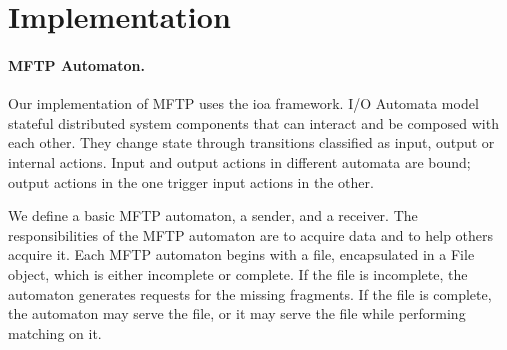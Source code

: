 \documentclass[letterpaper]{article}
\begin{document}




\section{Implementation}



\paragraph{MFTP Automaton.}
Our implementation of MFTP uses the ioa framework.
I/O Automata model stateful distributed system components that can interact and be composed with each other.
They change state through transitions classified as input, output or internal actions.
Input and output actions in different automata are bound; output actions in the one trigger input actions in the other.

We define a basic MFTP automaton, a sender, and a receiver.
The responsibilities of the MFTP automaton are to acquire data and to help others acquire it.
Each MFTP automaton begins with a file, encapsulated in a File object, which is either incomplete or complete.
If the file is incomplete, the automaton generates requests for the missing fragments.
If the file is complete, the automaton may serve the file, or it may serve the file while performing matching on it.
\end{document}
